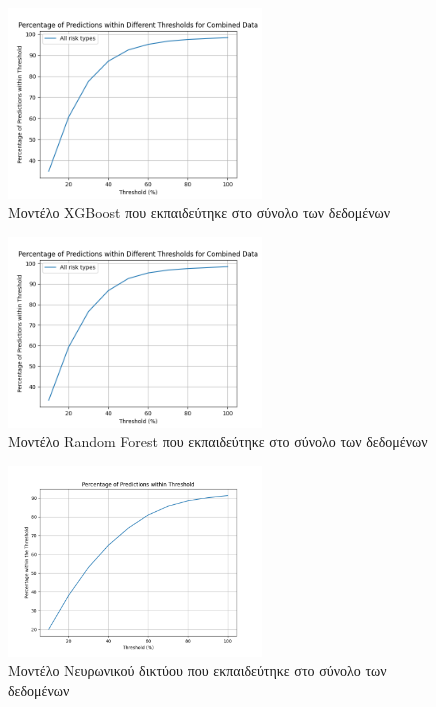 \documentclass{llncs}
\begin{document}
\begin{figure}
    \begin{center}
        \includegraphics[width=0.6\textwidth]{images/combined_trained_all_thresholds_xgb.png}
    \end{center}
    \caption{Μοντέλο XGBoost που εκπαιδεύτηκε στο σύνολο των δεδομένων}  
    \label{fig:XGBoost_result}  
\end{figure}

\begin{figure}
    \begin{center}
        \includegraphics[width=0.6\textwidth]{images/combined_trained_all_thresholds_random_forest.png}
    \end{center}
    \caption{Μοντέλο Random Forest που εκπαιδεύτηκε στο σύνολο των δεδομένων}  
    \label{fig:random_forest_result}  
\end{figure}

\begin{figure}
    \begin{center}
        \includegraphics[width=0.6\textwidth]{images/neural_network_all_thresholds.png}
    \end{center}
    \caption{Μοντέλο Νευρωνικού δικτύου που εκπαιδεύτηκε στο σύνολο των δεδομένων}  
    \label{fig:neural_result}  
\end{figure}
\end{document}
